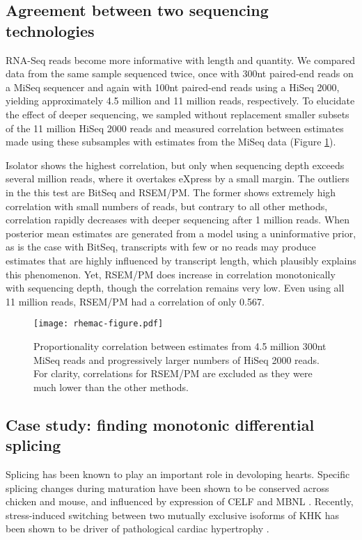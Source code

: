 \documentclass[twocolumn]{article}
\begin{document}
\subsection{Agreement between two sequencing
technologies}\label{agreement-between-two-sequencing-technologies}

RNA-Seq reads become more informative with length and quantity. We
compared data from the same sample sequenced twice, once with 300nt
paired-end reads on a MiSeq sequencer and again with 100nt paired-end
reads using a HiSeq 2000, yielding approximately 4.5 million and 11
million reads, respectively. To elucidate the effect of deeper
sequencing, we sampled without replacement smaller subsets of the 11
million HiSeq 2000 reads and measured correlation between estimates made using
these subsamples with estimates from the MiSeq data (Figure \ref{fig:rhemac}).

Isolator shows the highest correlation, but only when sequencing depth
exceeds several million reads, where it overtakes eXpress by a small
margin. The outliers in the this test are BitSeq and RSEM/PM. The former
shows extremely high correlation with small numbers of reads, but
contrary to all other methods, correlation rapidly decreases with deeper
sequencing after 1 million reads. When posterior mean estimates are
generated from a model using a uninformative prior, as is the case with
BitSeq, transcripts with few or no reads may produce estimates that are
highly influenced by transcript length, which plausibly explains this
phenomenon. Yet, RSEM/PM does increase in correlation monotonically with
sequencing depth, though the correlation remains very low. Even using
all 11 million reads, RSEM/PM had a correlation of only 0.567.

\begin{figure}
\texttt{[image: rhemac-figure.pdf]}
\caption{Proportionality correlation between estimates from 4.5 million 300nt
MiSeq reads and progressively larger numbers of HiSeq 2000 reads. For clarity,
correlations for RSEM/PM are excluded as they were much lower than the other
methods.}
\label{fig:rhemac}
\end{figure}

\subsection{Case study: finding monotonic differential splicing}\label{finding-monotonic-differential-splicing}

Splicing has been known to play an important role in devoloping hearts. Specific
splicing changes during maturation have been shown to be conserved across
chicken and mouse, and influenced by expression of CELF and MBNL
\cite{Kalsotra:2008ke}. Recently, stress-induced switching between two mutually
exclusive isoforms of KHK has been shown to be driver of pathological cardiac
hypertrophy \cite{Mirtschink:2015iq}.
\end{document}
